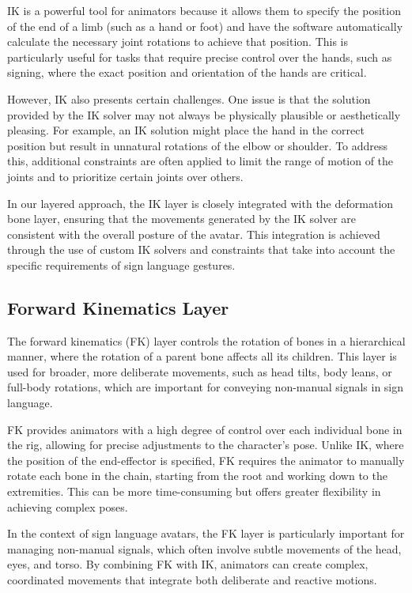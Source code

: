 \documentclass[../../main.tex]{subfiles}
\begin{document}
IK is a powerful tool for animators because it allows them to specify the position of the end of a limb (such as a hand or foot) and have the software automatically calculate the necessary joint rotations to achieve that position. This is particularly useful for tasks that require precise control over the hands, such as signing, where the exact position and orientation of the hands are critical.

However, IK also presents certain challenges. One issue is that the solution provided by the IK solver may not always be physically plausible or aesthetically pleasing. For example, an IK solution might place the hand in the correct position but result in unnatural rotations of the elbow or shoulder. To address this, additional constraints are often applied to limit the range of motion of the joints and to prioritize certain joints over others.

In our layered approach, the IK layer is closely integrated with the deformation bone layer, ensuring that the movements generated by the IK solver are consistent with the overall posture of the avatar. This integration is achieved through the use of custom IK solvers and constraints that take into account the specific requirements of sign language gestures.

\subsection{Forward Kinematics Layer}
The forward kinematics (FK) layer controls the rotation of bones in a hierarchical manner, where the rotation of a parent bone affects all its children. This layer is used for broader, more deliberate movements, such as head tilts, body leans, or full-body rotations, which are important for conveying non-manual signals in sign language.

FK provides animators with a high degree of control over each individual bone in the rig, allowing for precise adjustments to the character's pose. Unlike IK, where the position of the end-effector is specified, FK requires the animator to manually rotate each bone in the chain, starting from the root and working down to the extremities. This can be more time-consuming but offers greater flexibility in achieving complex poses.

In the context of sign language avatars, the FK layer is particularly important for managing non-manual signals, which often involve subtle movements of the head, eyes, and torso. By combining FK with IK, animators can create complex, coordinated movements that integrate both deliberate and reactive motions.
\end{document}

